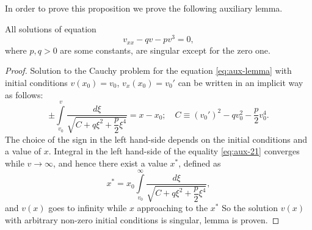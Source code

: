 In order to prove this proposition we prove the following auxiliary lemma.
\begin{lemma}
	All solutions of equation
	\begin{equation}
		v_{xx} - q v - p v^3 = 0,
		\label{eq:aux-lemma}
	\end{equation}
	where $p, q > 0$ are some constants, are singular except for the zero one.
\end{lemma}
\begin{proof}
	Solution to the Cauchy problem for the equation \eqref{eq:aux-lemma} with initial conditions $v(x_0) = v_0$, $v_x(x_0) = v_0'$ can be written in an implicit way as follows:
	\begin{equation}
		\pm \int \limits_{v_0}^{v} \dfrac{d\xi}{\sqrt{C + q \xi^2 + \dfrac{p}{2} \xi^4}} = x - x_0;	\quad C \equiv (v_0')^2 - q v_0^2 - \dfrac{p}{2} v_0^4.
		\label{eq:aux-21}
	\end{equation}
	The choice of the sign in the left hand-side depends on the initial conditions and a value of $x$.
	Integral in the left hand-side of the equality \eqref{eq:aux-21} converges while $v \to \infty$, and hence there exist a value $x^*$, defined as
	\begin{equation}
		x^* = x_0 \int \limits_{v_0}^{\infty} \dfrac{d\xi}{\sqrt{C + q \xi^2 + \dfrac{p}{2} \xi^4}},
	\end{equation}
	and $v(x)$ goes to infinity while $x$ approaching to the $x^*$ 
	So the solution $v(x)$ with arbitrary non-zero initial conditions is singular, lemma is proven.
\end{proof}

